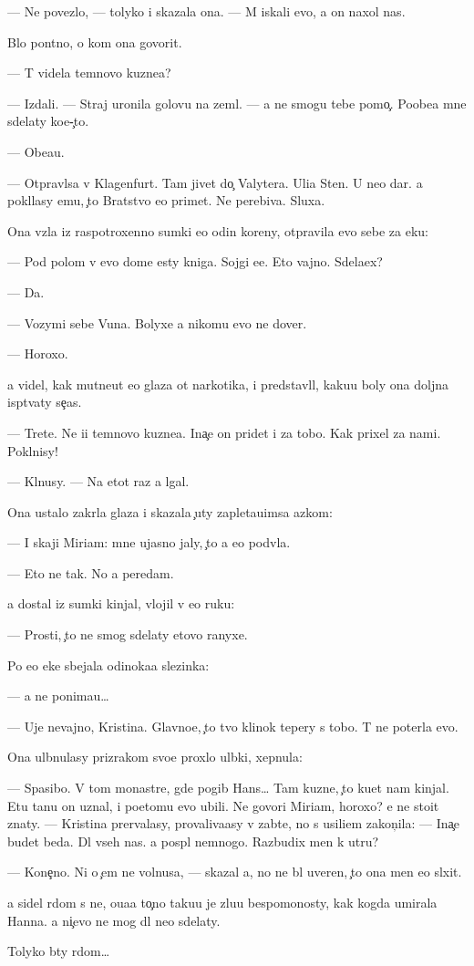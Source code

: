 \documentclass[10pt]{book}
\begin{document}
— Ne povezlo, — tolyko i skazala ona. — M{\yi} iskali {\y}evo, a on naxol nas.

B{\yi}lo pon{\ia}tno, o kom ona govorit.

— T{\yi} videla temnovo kuzne{\q}a?

— Izdali. — Straj uronila golovu na zeml{\iu}. — {\Y}a ne smogu tebe pomo{\c}. Poobe{\x}a{\y} mne sdelaty ko{\y}e-{\c}to.

— Obe{\x}a{\y}u.

— Otpravl{\ia}{\y}sa v Klagenfurt. Tam jivet do{\c} Valytera. Uli{\q}a Sten{\yi}. U ne{\y}o dar. {\Y}a pokl{\ia}lasy {\y}emu, {\c}to Bratstvo {\y}e{\y}o primet. Ne perebiva{\y}. Sluxa{\y}.

Ona vz{\ia}la iz raspotroxenno{\y} sumki {\y}e{\x}o odin koreny, otpravila {\y}evo sebe za {\x}eku:

— Pod polom v {\y}evo dome {\y}esty kniga. Sojgi {\y}e{\y}e. Eto vajno. Sdela{\y}ex?

— Da.

— Vozymi sebe V{\y}una. Bolyxe {\y}a nikomu {\y}evo ne dover{\iu}.

— Horoxo.

{\Y}a videl, kak mutne{\y}ut {\y}e{\y}o glaza ot narkotika, i predstavl{\ia}l, kaku{\y}u boly ona doljna isp{\yi}t{\yi}vaty se{\y}{\c}as.

— Tret{\y}e. Ne i{\x}i temnovo kuzne{\q}a. Ina{\c}e on pridet i za tobo{\y}. Kak prixel za nami. Pokl{\ia}nisy!

— Kl{\ia}nusy. — Na etot raz {\y}a lgal.

Ona ustalo zakr{\yi}la glaza i skazala {\c}uty zapleta{\y}u{\x}imsa {\y}az{\yi}kom:

— I skaji Miriam: mne ujasno jaly, {\c}to {\y}a {\y}e{\y}o podv{\e}la.

— Eto ne tak. No {\y}a peredam.

{\Y}a dostal iz sumki kinjal, vlojil v {\y}e{\y}o ruku:

— Prosti, {\c}to ne smog sdelaty etovo ranyxe.

Po {\y}e{\y}o {\x}eke sbejala odinoka{\y}a slezinka:

— {\Y}a ne ponima{\y}u…

— Uje nevajno, Kristina. Glavno{\y}e, {\c}to tvo{\y} klinok tepery s tobo{\y}. T{\yi} ne poter{\ia}la {\y}evo.

Ona ul{\yi}bnulasy prizrakom svo{\y}e{\y} proxlo{\y} ul{\yi}bki, xepnula:

— Spasibo. V tom monast{\yi}re, gde pogib Hans… Tam kuzne{\q}, {\c}to ku{\y}et nam kinjal{\yi}. Etu ta{\y}nu on uznal, i poetomu {\y}evo ubili. Ne govori Miriam, horoxo? {\Y}e{\y} ne sto{\y}it znaty. — Kristina prervalasy, provaliva{\y}asy v zab{\yi}t{\y}e, no s usili{\y}em zakon{\c}ila: — Ina{\c}e budet beda. Dl{\ia} vseh nas. {\Y}a pospl{\iu} nemnogo. Razbudix men{\ia} k utru?

— Kone{\c}no. Ni o {\c}em ne volnu{\y}sa, — skazal {\y}a, no ne b{\yi}l uveren, {\c}to ona men{\ia} {\y}e{\x}o sl{\yi}xit.

{\Y}a sidel r{\ia}dom s ne{\y}, o{\x}u{\x}a{\y}a to{\c}no taku{\y}u je zlu{\y}u bespomo{\x}nosty, kak kogda umirala Hanna. {\Y}a ni{\c}evo ne mog dl{\ia} ne{\y}o sdelaty.

Tolyko b{\yi}ty r{\ia}dom…
\end{document}
